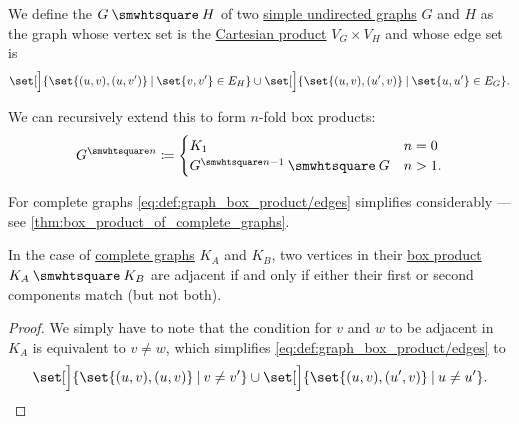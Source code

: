 \begin{definition}\label{def:graph_box_product}
  We define the  \( G \boxprod H \) of two \hyperref[def:undirected_graph]{simple undirected graphs} \( G \) and \( H \) as the graph whose vertex set is the \hyperref[def:cartesian_product]{Cartesian product} \( V_G \times V_H \) and whose edge set is
  \begin{equation}\label{eq:def:graph_box_product/edges}
    \set[\Big]{ \set{ (u, v), (u, v') } \given \set{ v, v' } \in E_H } \cup \set[\Big]{ \set{ (u, v), (u', v) } \given \set{ u, u' } \in E_G }.
  \end{equation}

  We can recursively extend this to form \( n \)-fold box products:
  \begin{equation}\label{eq:def:graph_box_product/recursive}
    G^{\boxprod n} \coloneqq \begin{cases}
      K_1                           &n = 0 \\
      G^{\boxprod n - 1} \boxprod G &n > 1.
    \end{cases}
  \end{equation}
\end{definition}
\begin{comments}
  \item For complete graphs \eqref{eq:def:graph_box_product/edges} simplifies considerably --- see \cref{thm:box_product_of_complete_graphs}.
\end{comments}

\begin{proposition}\label{thm:box_product_of_complete_graphs}
  In the case of \hyperref[def:complete_graph]{complete graphs} \( K_A \) and \( K_B \), two vertices in their \hyperref[def:graph_box_product]{box product} \( K_A \boxprod K_B \) are adjacent if and only if either their first or second components match (but not both).
\end{proposition}
\begin{proof}
  We simply have to note that the condition for \( v \) and \( w \) to be adjacent in \( K_A \) is equivalent to \( v \neq w \), which simplifies \eqref{eq:def:graph_box_product/edges} to
  \begin{equation*}
    \set[\Big]{ \set{ (u, v), (u, v) } \given v \neq v' } \cup \set[\Big]{ \set{ (u, v), (u', v) } \given u \neq u' }.
  \end{equation*}
\end{proof}

